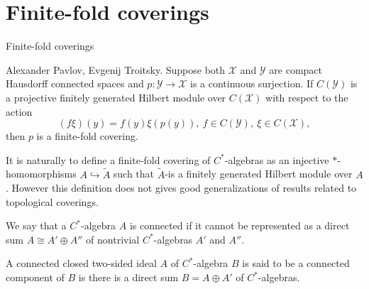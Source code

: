 \documentclass{beamer}
\theoremstyle{plain}
\newcommand{\hookto}{\hookrightarrow}        %
\begin{document}
\section{Finite-fold coverings}
\begin{frame}
	\begin{center}
	\huge{Finite-fold coverings}
	\end{center}
	\begin{theorem} 	\alert{Alexander Pavlov, Evgenij Troitsky}.
		Suppose both $\mathcal X$ and $\mathcal Y$ are compact Hausdorff connected spaces and $p :\mathcal  Y \to \mathcal X$
		is a continuous surjection. If $C(\mathcal Y )$ is a projective finitely generated Hilbert module over
		$C(\mathcal X)$ with respect to the action
		\begin{equation*}
			(f\xi)(y) = f(y)\xi(p(y)), ~ f \in  C(\mathcal Y ), ~ \xi \in  C(\mathcal X),
		\end{equation*}
		then $p$ is a finite-fold  covering.
	\end{theorem}
	It is naturally to define a finite-fold covering of $C^*$-algebras as an injective $*$-homomorphisms $A\hookto \widetilde A$ such that $ \widetilde A$-is a finitely generated Hilbert module over
	$A$. However this definition does not gives good generalizations of results  related to topological coverings.
	
\end{frame}
\begin{frame}
  \begin{definition}
	We say that a $C^*$-algebra $A$ is \alert{connected} if it cannot be represented as a direct sum  $A \cong A' \oplus A''$ of nontrivial $C^*$-algebras $A'$ and $A''$.
	
\end{definition}
\begin{definition}
	A connected closed two-sided ideal $A$ of  $C^*$-algebra $B$ is said to be a \alert{connected component of}  $B$ is there is a direct sum $B = A \oplus A'$ of $C^*$-algebras.
	\end{definition}
\end{frame}
\end{document}
